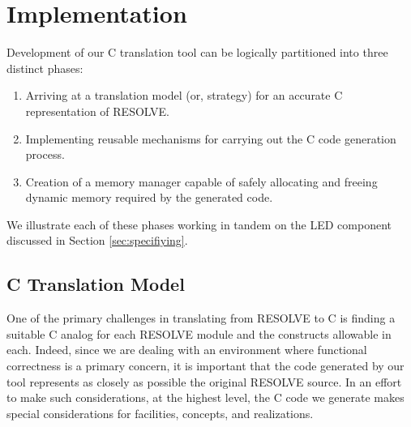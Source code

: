 \section{Implementation}
Development of our C translation tool can be logically partitioned into three distinct phases: 
\begin{enumerate}
\item Arriving at a translation model (or, strategy) for an accurate C representation of RESOLVE.
\item Implementing reusable mechanisms for carrying out the C code generation process.
\item Creation of a memory manager capable of safely allocating and freeing dynamic memory required by the generated code.
\end{enumerate}
We illustrate each of these phases working in tandem on the LED component discussed in Section \ref{sec:specifiying}. 


\subsection{C Translation Model}
One of the primary challenges in translating from RESOLVE to C is finding a suitable C analog for each RESOLVE module and the constructs allowable in each. Indeed, since we are dealing with an environment where functional correctness is a primary concern, it is important that the code generated by our tool represents as closely as possible the original RESOLVE source. In an effort to make such considerations, at the highest level, the C code we generate makes special considerations for facilities, concepts, and realizations. 

